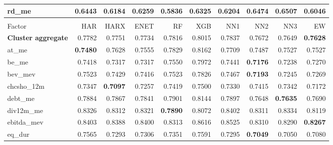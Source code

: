 \begin{longtable}{>{\raggedright\arraybackslash}p{2.6cm}rrrrrrrrr}
rd\_me & 0.6443 & \cellcolor{blue!10}0.6184 & \cellcolor{blue!10}0.6259 & \textbf{\cellcolor{blue!10}0.5836} & \cellcolor{blue!10}0.6325 & \cellcolor{blue!10}0.6204 & 0.6474 & 0.6507 & \cellcolor{blue!10}0.6046 \\
\hline
\multicolumn{10}{@{}l}{\textit{Panel M. Value}} \\
\hline
Factor & HAR & HARX & ENET & RF & XGB & NN1 & NN2 & NN3 & EW \\
\hline
\textbf{Cluster aggregate} & 0.7782 & \cellcolor{blue!10}0.7751 & \cellcolor{blue!10}0.7734 & 0.7816 & 0.8015 & 0.7837 & \cellcolor{blue!10}0.7672 & \cellcolor{blue!10}0.7649 & \textbf{\cellcolor{blue!10}0.7628} \\
at\_me & \textbf{0.7480} & 0.7628 & 0.7555 & 0.7829 & 0.8162 & 0.7709 & 0.7487 & 0.7527 & 0.7527 \\
be\_me & 0.7418 & \cellcolor{blue!10}0.7317 & \cellcolor{blue!10}0.7317 & 0.7550 & 0.7972 & 0.7441 & \textbf{\cellcolor{blue!10}0.7176} & \cellcolor{blue!10}0.7238 & \cellcolor{blue!10}0.7270 \\
bev\_mev & 0.7523 & \cellcolor{blue!10}0.7429 & \cellcolor{blue!10}0.7416 & \cellcolor{blue!10}0.7523 & 0.7826 & \cellcolor{blue!10}0.7467 & \textbf{\cellcolor{blue!10}0.7193} & \cellcolor{blue!10}0.7245 & \cellcolor{blue!10}0.7269 \\
chcsho\_12m & 0.7347 & \textbf{\cellcolor{blue!10}0.7097} & \cellcolor{blue!10}0.7257 & 0.7419 & 0.7500 & \cellcolor{blue!10}0.7330 & 0.7415 & \cellcolor{blue!10}0.7342 & \cellcolor{blue!10}0.7172 \\
debt\_me & 0.7884 & \cellcolor{blue!10}0.7867 & \cellcolor{blue!10}0.7841 & 0.7901 & 0.8144 & 0.7897 & \cellcolor{blue!10}0.7648 & \textbf{\cellcolor{blue!10}0.7635} & \cellcolor{blue!10}0.7690 \\
div12m\_me & 0.8326 & \cellcolor{blue!10}0.8312 & \cellcolor{blue!10}0.8321 & \textbf{\cellcolor{blue!10}0.7890} & \cellcolor{blue!10}0.8072 & 0.8402 & \cellcolor{blue!10}0.8311 & 0.8334 & \cellcolor{blue!10}0.8119 \\
ebitda\_mev & 0.8403 & \cellcolor{blue!10}0.8388 & \cellcolor{blue!10}0.8400 & \cellcolor{blue!10}0.8313 & 0.8616 & 0.8525 & \cellcolor{blue!10}0.8310 & \cellcolor{blue!10}0.8290 & \textbf{\cellcolor{blue!10}0.8267} \\
eq\_dur & 0.7565 & \cellcolor{blue!10}0.7293 & \cellcolor{blue!10}0.7306 & \cellcolor{blue!10}0.7351 & 0.7591 & \cellcolor{blue!10}0.7295 & \textbf{\cellcolor{blue!10}0.7049} & \cellcolor{blue!10}0.7050 & \cellcolor{blue!10}0.7080 \\

\end{longtable}
